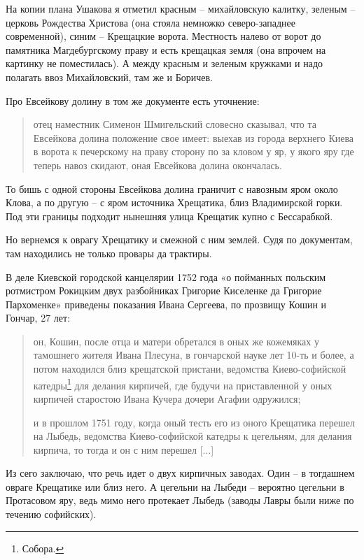 На копии плана Ушакова я отметил красным – михайловскую калитку, зеленым – церковь Рождества Христова (она стояла немножко северо-западнее современной), синим – Крещацкие ворота. Местность налево от ворот до памятника Магдебургскому праву и есть крещацкая земля (она впрочем на картинку не поместилась). А между красным и зеленым кружками и надо полагать ввоз Михайловский, там же и Боричев.

Про Евсейкову долину в том же документе есть уточнение:

\begin{quotation}
отец наместник Сименон Шмигельский словесно сказывал, что та Евсейкова долина положение свое имеет: выехав из города верхнего Киева в ворота к печерскому на праву сторону по за кловом у яр, у якого яру где теперь навоз скидают, оная Евсейкова долина окончалась.
\end{quotation}

То бишь с одной стороны Евсейкова долина граничит с навозным яром около Клова, а по другую – с яром источника Хрещатика, близ Владимирской горки. Под эти границы подходит нынешняя улица Крещатик купно с Бессарабкой.

Но вернемся к оврагу Хрещатику и смежной с ним землей. Судя по документам, там находились не только провары да трактиры.
 
В деле Киевской городской канцелярии 1752 года «о пойманных польским ротмистром Рокицким двух разбойниках Григорие Киселенке да Григорие Пархоменке» приведены показания Ивана Сергеева, по прозвищу Кошин и Гончар, 27 лет: 

\begin{quotation}
он, Кошин, после отца и матери обретался в оных же кожемяках у тамошнего жителя Ивана Плесуна, в гончарской науке лет 10-ть и более, а потом находился близ крещатской пристани, ведомства Киево-софийской катедры\footnote{Собора.} для делания кирпичей, где будучи на приставленной у оных кирпичей старостою Ивана Кучера дочери Агафии одружился; 

и в прошлом 1751 году, когда оный тесть его из оного Крещатика перешел на Лыбедь, ведомства Киево-софийской катедры к цегельням, для делания кирпича, то тогда и он с ним перешел [...]
\end{quotation} 

Из сего заключаю, что речь идет о двух кирпичных заводах. Один – в тогдашнем овраге Крещатике или близ него. А цегельни на Лыбеди – вероятно цегельни в Протасовом яру, ведь мимо него протекает Лыбедь (заводы Лавры были ниже по течению софийских).

